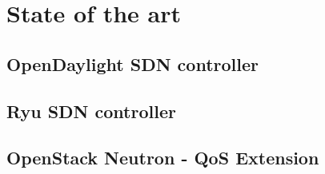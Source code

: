 \chapter{State of the art}

\section{OpenDaylight SDN controller}

\section{Ryu SDN controller}

\section{OpenStack Neutron - QoS Extension}